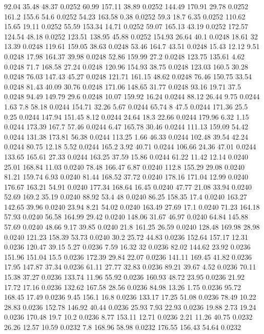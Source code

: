 92.04	35.48	48.37	0.0252
60.99	157.11	38.89	0.0252
144.49	170.91	29.78	0.0252
161.2	155.6	54.6	0.0252
54.23	163.58	0.38	0.0252
59.3	18.7	6.35	0.0252
110.62	15.65	19.11	0.0252
55.59	153.34	14.71	0.0252
59.07	165.13	43.19	0.0252
172.57	124.54	48.18	0.0252
123.51	138.95	45.88	0.0252
154.93	26.64	40.1	0.0248
18.61	32	13.39	0.0248
119.61	159.05	38.63	0.0248
53.46	164.7	43.51	0.0248
15.43	12.12	9.51	0.0248
17.98	164.37	39.98	0.0248
52.86	159.99	27.2	0.0248
123.75	135.61	4.62	0.0248
71.7	168.58	27.24	0.0248
120.96	154.93	38.75	0.0248
123.03	160.5	30.28	0.0248
76.03	147.43	45.27	0.0248
121.71	161.15	48.62	0.0248
76.46	150.75	33.54	0.0248
81.43	40.09	30.76	0.0248
171.06	148.65	31.77	0.0248
93.16	19.71	37.5	0.0248
94.49	149.79	29.6	0.0248
10.07	159.92	16.24	0.0244
88.12	26.44	9.75	0.0244
1.63	7.8	58.18	0.0244
154.71	32.26	5.67	0.0244
65.74	8	47.5	0.0244
171.36	25.5	0.25	0.0244
147.94	151.45	8.12	0.0244
24.64	18.3	22.66	0.0244
179.96	6.32	1.15	0.0244
173.39	167.7	57.46	0.0244
6.47	165.78	30.46	0.0244
111.13	159.09	54.42	0.0244
131.38	173.81	56.38	0.0244
113.25	1.66	46.33	0.0244
102.48	39.54	42.24	0.0244
80.75	12.18	5.52	0.0244
165.2	3.92	40.71	0.0244
106.66	24.36	47.01	0.0244
133.65	165.61	27.33	0.0244
163.25	37.59	15.86	0.0244
61.22	11.42	12.14	0.0240
25.01	168.84	11.03	0.0240
78.48	166.47	6.87	0.0240
112.8	155.29	29.08	0.0240
81.21	159.74	6.93	0.0240
81.44	168.52	37.72	0.0240
178.16	171.04	12.99	0.0240
176.67	163.21	54.91	0.0240
177.34	168.64	16.45	0.0240
47.77	21.08	33.94	0.0240
52.69	169.2	35.19	0.0240
88.92	53.4	48	0.0240
86.25	158.35	17.4	0.0240
163.27	142.65	39.96	0.0240
23.94	8.21	54.02	0.0240
163.49	27.69	17.1	0.0240
71.23	164.18	57.93	0.0240
56.58	164.99	29.42	0.0240
148.06	31.67	46.97	0.0240
64.84	145.88	57.69	0.0240
48.66	9.17	39.85	0.0240
21.8	161.25	26.59	0.0240
128.48	169.98	28.98	0.0240
121.23	158.39	53.73	0.0240
30.2	25.72	44.83	0.0236
152.64	157.17	12.31	0.0236
120.47	39.15	5.27	0.0236
7.59	16.32	32	0.0236
82.02	144.62	23.92	0.0236
151.96	151.04	15.5	0.0236
172.39	29.84	22.07	0.0236
141.11	169.45	41.82	0.0236
17.95	147.87	37.34	0.0236
61.11	27.77	32.83	0.0236
89.21	39.67	4.52	0.0236
70.11	15.38	37.27	0.0236
133.74	11.96	55.92	0.0236
160.93	48.72	23.95	0.0236
21.92	17.72	17.16	0.0236
132.62	167.58	28.56	0.0236
84.98	13.26	1.75	0.0236
95.72	168.45	17.49	0.0236
9.45	156.1	16.8	0.0236
133.17	17.25	51.08	0.0236
78.49	10.22	28.83	0.0236
152.78	146.92	40.44	0.0236
25.93	7.93	22.93	0.0236
19.88	2.73	19.24	0.0236
170.48	19.7	10.2	0.0236
8.77	153.11	12.71	0.0236
2.21	11.26	40.75	0.0232
26.26	12.57	10.59	0.0232
7.8	168.96	58.98	0.0232
176.55	156.43	54.64	0.0232
